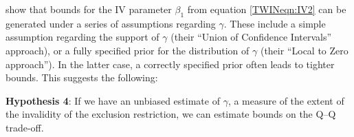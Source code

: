 \documentclass[subeqn]{article}
\begin{document}
\begin{spacing}{1.4}

\citet{Conleyetal2012} show that bounds for the IV parameter $\beta_1$
from equation \ref{TWINeqn:IV2} can be generated under a series of assumptions
regarding $\gamma$.  These include a simple assumption regarding the support of
$\gamma$ (their ``Union of Confidence Intervals'' approach), or a fully specified
prior for the distribution of $\gamma$ (their ``Local to Zero approach'').  In the
latter case, a correctly specified prior often leads to tighter bounds. This suggests the following:

\noindent \textbf{Hypothesis 4}: If we have an unbiased estimate of $\gamma$, a measure of the extent of the invalidity of the exclusion restriction, we can estimate bounds on the Q--Q trade-off.


\end{spacing}
\end{document}
